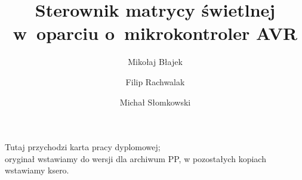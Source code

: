 \documentclass[polish,bachelor,a4paper,11pt,twoside]{ppfcmthesis}
\author{
   Mikołaj Błajek \album{99409} \and 
   Filip Rachwalak \album{99523} \and 
   Michał Słomkowski \album{100489}
}
\title{Sterownik matrycy świetlnej w~oparciu o~mikrokontroler AVR}                   %
\begin{document}
\frontmatter\pagestyle{empty}%
\maketitle\cleardoublepage%

\thispagestyle{empty}\vspace*{\fill}%
\begin{center}Tutaj przychodzi karta pracy dyplomowej;\\oryginał wstawiamy do wersji dla archiwum PP, w pozostałych kopiach wstawiamy ksero.\end{center}%
\vfill\cleardoublepage%

\pagestyle{ppfcmthesis}%
\tableofcontents* \cleardoublepage%

\mainmatter%






{\raggedright\sloppy\small}

\cleardoublepage\appendix%







\ppcolophon
\end{document}
